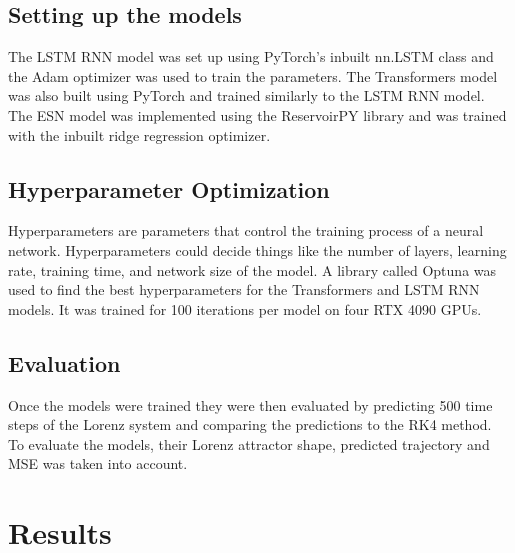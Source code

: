 \documentclass[11pt]{article}
\begin{document}
\subsection{Setting up the models}
The LSTM RNN model was set up using PyTorch's inbuilt nn.LSTM class and the Adam optimizer was used to train the parameters. The Transformers model was also built using PyTorch and trained similarly to the LSTM RNN model. The ESN model was implemented using the ReservoirPY library and was trained with the inbuilt ridge regression optimizer.

\subsection{Hyperparameter Optimization}
Hyperparameters are parameters that control the training process of a neural network. Hyperparameters could decide things like the number of layers, learning rate, training time, and network size of the model. A library called Optuna was used to find the best hyperparameters for the Transformers and LSTM RNN models. It was trained for 100 iterations per model on four RTX 4090 GPUs.

\subsection{Evaluation}
Once the models were trained they were then evaluated by predicting 500 time steps of the Lorenz system and comparing the predictions to the RK4 method. To evaluate the models, their Lorenz attractor shape, predicted trajectory and MSE
was taken into account.

\section{Results}
\end{document}
